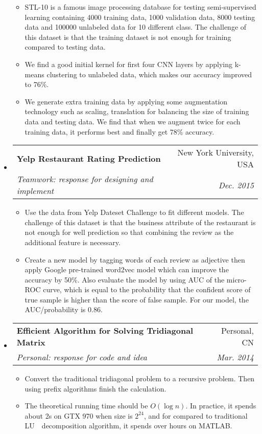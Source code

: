 \documentclass[a4paper,11pt]{article}
\makeatletter
\newcommand{\resitem}[1]{\item #1 \vspace{-2pt}}
\renewcommand{\normalsize}{\fontsize{12pt}{\baselineskip}\selectfont}
\newcommand{\ressubheading}[4]{
	\begin{tabular*}{6.5in}{l@{\extracolsep{\fill}}r}
		\textbf{#1} & #2 \\
		\textit{#3} & \textit{#4} \\
	\end{tabular*}\vspace{-6pt}}
\makeatother
\begin{document}
\begin{itemize}
			\begin{itemize}
				\resitem{STL-10 is a famous image processing database for testing semi-supervised learning containing 4000 training data, 1000 validation data, 8000 testing data and 100000 unlabeled data for 10 different class. The challenge of this dataset is that the training dataset is not enough for training compared to testing data.}
				\resitem{We find a good initial kernel for first four CNN layers by applying k-means clustering to unlabeled data, which makes our accuracy improved to 76\%.} 
				\resitem{We generate extra training data by applying some augmentation technology such as scaling, translation for balancing the size of training data and testing data. We find that when we augment twice for each training data, it performs best and finally get 78\% accuracy.}
			\end{itemize}
			
				\item \ressubheading{{\normalsize Yelp Restaurant Rating Prediction}}{New York University, USA}{\normalsize Teamwork: response for designing and implement}{Dec. 2015}
				
					\begin{itemize}
						\resitem{Use the data from Yelp Dateset Challenge to fit different models. The challenge of this dataset is that the business attribute of the restaurant is not enough for well prediction so that combining the review as the additional feature is necessary.}
						\resitem{Create a new model by tagging words of each review as adjective then apply Google pre-trained word2vec model which can improve the accuracy by 50\%. Also evaluate the model by using AUC of the micro-ROC curve, which is equal to the probability that the confident score of true sample is higher than the score of false sample. For our model, the AUC/probability is 0.86.}
					\end{itemize}
			
			
			
			
				\item \ressubheading{\normalsize Efficient Algorithm for Solving Tridiagonal Matrix}{Personal, CN}{\normalsize Personal: response for code and idea}{Mar. 2014}
				\begin{itemize}
					\resitem{Convert the traditional tridiagonal problem to a recursive problem. Then using prefix algorithms finish the calculation.}
					\resitem{The theoretical running time should be $ O(\log n) $. In practice, it spends about 2s on GTX 970 when size is $ 2^{24} $, and for compared to traditional LU　decomposition algorithm, it spends over hours on MATLAB.} 
				\end{itemize}
		\end{itemize}
		
\end{document}
